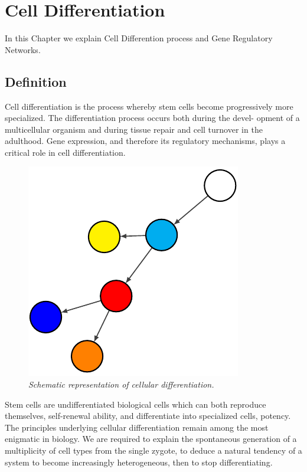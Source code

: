 \chapter{Cell Differentiation }\label{celldiff}
\lhead[\fancyplain{}{\bfseries\thepage}]{\fancyplain{}{\bfseries\rightmark}}

In this Chapter we explain Cell Differention process and Gene Regulatory Networks.

\section{Definition}
Cell differentiation is the process whereby stem cells become progressively
more specialized. The differentiation process occurs both during the devel-
opment of a multicellular organism and during tissue repair and cell turnover
in the adulthood. Gene expression, and therefore its regulatory mechanisms,
plays a critical role in cell differentiation.
\begin{figure}
\centering
\includegraphics[angle=45]{images/cells.pdf}
\caption{\emph{Schematic representation of cellular differentiation.}}
\end{figure}
Stem cells are undifferentiated biological cells which can both reproduce
themselves, self-renewal ability, and differentiate into specialized cells, potency.
The principles underlying cellular differentiation remain among the most
enigmatic in biology. We are required to explain the spontaneous generation of a multiplicity of cell types from the single zygote, to deduce a natural
tendency of a system to become increasingly heterogeneous, then to stop
differentiating.

